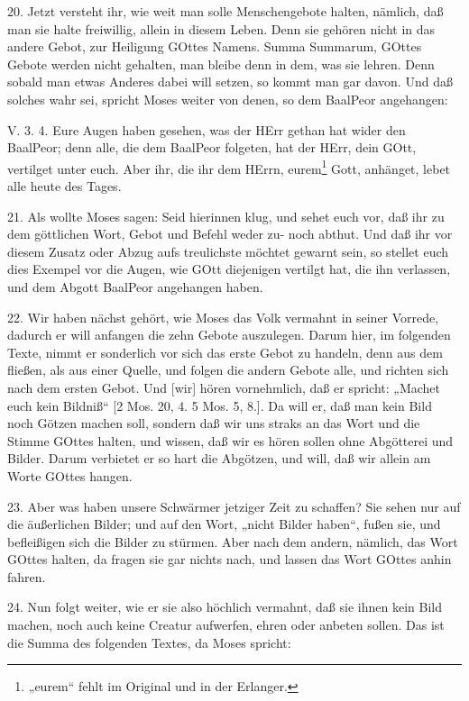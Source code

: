 20. Jetzt versteht ihr, wie weit man solle Menschengebote halten, nämlich, daß man sie halte freiwillig, allein in diesem Leben. Denn sie gehören nicht in das andere Gebot, zur Heiligung GOttes Namens. Summa Summarum, GOttes Gebote werden nicht gehalten, man bleibe denn in dem, was sie lehren. Denn sobald man etwas Anderes dabei will setzen, so kommt man gar davon. Und daß solches wahr sei, spricht Moses weiter von denen, so dem BaalPeor angehangen:

\begin{schriftzitat}
V. 3. 4. Eure Augen haben gesehen, was der HErr gethan hat wider den BaalPeor; denn alle, die dem BaalPeor folgeten, hat der HErr, dein GOtt, vertilget unter euch. Aber ihr, die ihr dem HErrn, eurem\footnote{„eurem“ fehlt im Original und in der Erlanger.} Gott, anhänget, lebet alle heute des Tages.
\end{schriftzitat}

21. Als wollte Moses sagen: Seid hierinnen klug, und sehet euch vor, daß ihr zu dem göttlichen Wort, Gebot und Befehl weder zu- noch abthut. Und daß ihr vor diesem Zusatz oder Abzug aufs treulichste möchtet gewarnt sein, so stellet euch dies Exempel vor die Augen, wie GOtt diejenigen vertilgt hat, die ihn verlassen, und dem Abgott BaalPeor angehangen haben.

22. Wir haben nächst gehört, wie Moses das Volk vermahnt in seiner Vorrede, dadurch er will anfangen die zehn Gebote auszulegen. Darum hier, im folgenden Texte, nimmt er sonderlich vor sich das erste Gebot zu handeln, denn aus dem fließen, als aus einer Quelle, und folgen die andern Gebote alle, und richten sich nach dem ersten Gebot. Und [wir] hören vornehmlich, daß er spricht: „Machet euch kein Bildniß“ [2 Mos. 20, 4. 5 Mos. 5, 8.]. Da will er, daß man kein Bild noch Götzen machen soll, sondern daß wir uns straks an das Wort und die Stimme GOttes halten, und wissen, daß wir es hören sollen ohne Abgötterei und Bilder. Darum verbietet er so hart die Abgötzen, und will, daß wir allein am Worte GOttes hangen.

23. Aber was haben unsere Schwärmer jetziger Zeit zu schaffen? Sie sehen nur auf die äußerlichen Bilder; und auf den Wort, „nicht Bilder haben“, fußen sie, und befleißigen sich die Bilder zu stürmen. Aber nach dem andern, nämlich, das Wort GOttes halten, da fragen sie gar nichts nach, und lassen das Wort GOttes anhin fahren.

24. Nun folgt weiter, wie er sie also höchlich vermahnt, daß sie ihnen kein Bild machen, noch auch keine Creatur aufwerfen, ehren oder anbeten sollen. Das ist die Summa des folgenden Textes, da Moses spricht:


